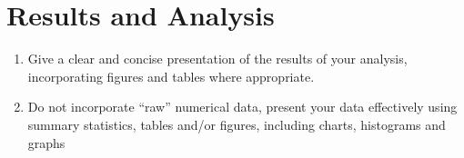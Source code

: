 \section{Results and Analysis}

\begin{enumerate}
\item Give a clear and concise presentation of the results of your analysis, incorporating figures and tables where appropriate.
\item Do not incorporate “raw” numerical data, present your data effectively using summary statistics, tables and/or figures, including charts, histograms and graphs
\end{enumerate}